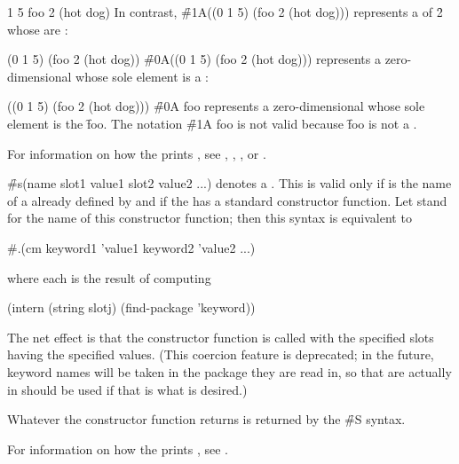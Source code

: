        1       5
 foo     2       (hot dog)
\endcode
In contrast, \f{\#1A((0 1 5) (foo 2 (hot dog)))} 
represents a  of  \f{2} 
whose  are :

\code
 (0 1 5) (foo 2 (hot dog))
\endcode
\f{\#0A((0 1 5) (foo 2 (hot dog)))} represents a zero-dimensional
 whose sole element is a :

\code
 ((0 1 5) (foo 2 (hot dog)))
\endcode
\f{\#0A foo} represents 
a zero-dimensional  whose sole element is the 
 \f{foo}.
The notation \f{\#1A foo} is not valid because \f{foo} is
not a .

For information on how the  prints ,
see \secref\PrintingStrings,
    \secref\PrintingBitVectors,
    \secref\PrintingOtherVectors,
 or \secref\PrintingOtherArrays.

\endsubsubsection%



\f{\#s(name slot1 value1 slot2 value2 ...)}
denotes a .  This is valid only if  is the name
of a   already defined by  
and if the   has a standard constructor function.
Let  stand for the name of this constructor function;
then this syntax is equivalent to

\code
 #.(cm keyword1 'value1 keyword2 'value2 ...)
\endcode

where each  is the result of computing

\code
 (intern (string slotj) (find-package 'keyword))
\endcode
    
The net effect is that the constructor function is called with the specified
slots having the specified values. 
(This coercion feature is deprecated; in the future, keyword names will 
 be taken in the package they are read in, so  that are 
 actually in  should be used if that is what is desired.)

Whatever  the constructor function returns
is returned by the \f{\#S} syntax.

For information on how the  prints ,
see \secref\PrintingStructures.

